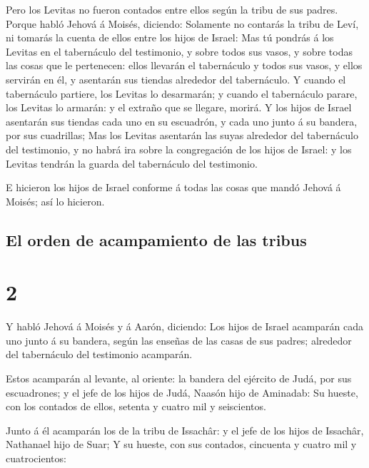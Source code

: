  Pero los Levitas no fueron contados entre ellos según la
tribu de sus padres.  Porque habló Jehová á Moisés,
diciendo:  Solamente no contarás la tribu de Leví, ni
tomarás la cuenta de ellos entre los hijos de Israel: 
Mas tú pondrás á los Levitas en el tabernáculo del testimonio, y sobre
todos sus vasos, y sobre todas las cosas que le pertenecen: ellos
llevarán el tabernáculo y todos sus vasos, y ellos servirán en él, y
asentarán sus tiendas alrededor del tabernáculo.  Y
cuando el tabernáculo partiere, los Levitas lo desarmarán; y cuando el
tabernáculo parare, los Levitas lo armarán: y el extraño que se llegare,
morirá.  Y los hijos de Israel asentarán sus tiendas cada
uno en su escuadrón, y cada uno junto á su bandera, por sus cuadrillas;
 Mas los Levitas asentarán las suyas alrededor del
tabernáculo del testimonio, y no habrá ira sobre la congregación de los
hijos de Israel: y los Levitas tendrán la guarda del tabernáculo del
testimonio.

 E hicieron los hijos de Israel conforme á todas las
cosas que mandó Jehová á Moisés; así lo hicieron.

\hypertarget{el-orden-de-acampamiento-de-las-tribus}{%
\subsection{El orden de acampamiento de las
tribus}\label{el-orden-de-acampamiento-de-las-tribus}}

\hypertarget{section-04-2}{%
\section{2}\label{section-04-2}}

 Y habló Jehová á Moisés y á Aarón, diciendo:
 Los hijos de Israel acamparán cada uno junto á su
bandera, según las enseñas de las casas de sus padres; alrededor del
tabernáculo del testimonio acamparán.

 Estos acamparán al levante, al oriente: la bandera del
ejército de Judá, por sus escuadrones; y el jefe de los hijos de Judá,
Naasón hijo de Aminadab:  Su hueste, con los contados de
ellos, setenta y cuatro mil y seiscientos.

 Junto á él acamparán los de la tribu de Issachâr: y el
jefe de los hijos de Issachâr, Nathanael hijo de Suar;  Y
su hueste, con sus contados, cincuenta y cuatro mil y cuatrocientos:

